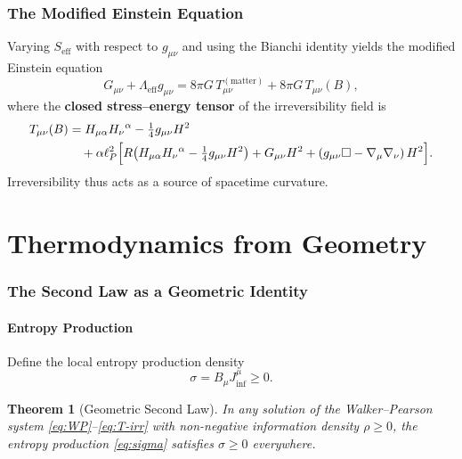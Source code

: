 \documentclass[12pt,a4paper]{article}
\newtheorem{theorem}{Theorem}[section]
\newcommand{\gm}{g_{\mu\nu}}       %
\newcommand{\lP}{\ell_P}           %
\newcommand{\Seff}{S_{\text{eff}}} %
\newcommand{\sigmaS}{\sigma}       %
\begin{document}
\section{The Modified Einstein Equation}
\label{sec:modified-einstein}

Varying $\Seff$ with respect to $\gm$ and using the Bianchi identity yields
the modified Einstein equation
\begin{equation}
  G_{\mu\nu} + \Lambda_{\text{eff}} g_{\mu\nu}
  = 8\pi G\,T_{\mu\nu}^{(\text{matter})}
    + 8\pi G\,T_{\mu\nu}(B) ,
  \label{eq:modified-einstein}
\end{equation}
where the \textbf{closed stress--energy tensor} of the irreversibility field is
\begin{align}
  T_{\mu\nu}(B) &=
    H_{\mu\alpha}H_{\nu}{}^{\alpha}
    - \tfrac{1}{4}\gm H^2 \nonumber\\
  &\quad + \alpha\lP^2\Bigl[
      R\!\left(H_{\mu\alpha}H_\nu{}^\alpha - \tfrac{1}{4}\gm H^2\right)
      + G_{\mu\nu}H^2
      + \left(\gm\Box - \nabla_\mu\nabla_\nu\right)H^2
    \Bigr] .
  \label{eq:T-irr}
\end{align}
Irreversibility thus acts as a source of spacetime curvature.

\part{Thermodynamics from Geometry}

\section{The Second Law as a Geometric Identity}
\label{sec:second-law}

\subsection{Entropy Production}

Define the local entropy production density
\begin{equation}
  \sigmaS = B_\mu J_{\inf}^\mu \ge 0 .
  \label{eq:sigma}
\end{equation}

\begin{theorem}[Geometric Second Law]
  In any solution of the Walker--Pearson system \eqref{eq:WP}--\eqref{eq:T-irr}
  with non-negative information density $\rho\ge 0$, the entropy production
  \eqref{eq:sigma} satisfies $\sigmaS \ge 0$ everywhere.
\end{theorem}
\end{document}

